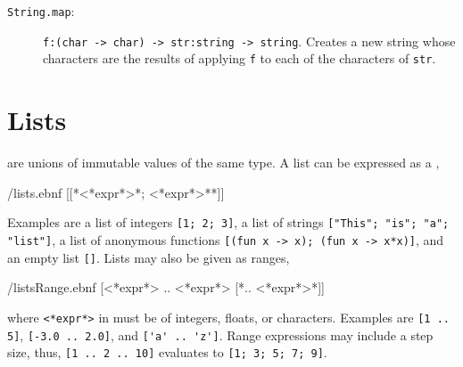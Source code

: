 \documentclass[fsharpnotes.tex]{subfiles}
\begin{document}
\begin{description}
 \item[\texttt{String.map}:] \lstinline{f:(char -> char) -> str:string -> string}. Creates a new string whose characters are the results of applying \lstinline{f} to each of the characters of \lstinline{str}.
\end{description}

\section{Lists}
 are unions of immutable values of the same type. A list can be expressed as a ,
%
\begin{verbatimwrite}{\ebnf/lists.ebnf}
[[*<*expr*>{*; <*expr*>*}*]]
\end{verbatimwrite}
%
Examples are a list of integers \mbox{\lstinline![1; 2; 3]!}, a list of strings \mbox{\lstinline!["This"; "is"; "a"; "list"]!}, a list of anonymous functions \mbox{\lstinline![(fun x -> x); (fun x -> x*x)]!}, and an empty list \lstinline![]!. Lists may also be given as ranges,
%
\begin{verbatimwrite}{\ebnf/listsRange.ebnf}
[<*expr*> .. <*expr*> [*.. <*expr*>*]]
\end{verbatimwrite}
%
where \lstinline[language=syntax]{<*expr*>} in  must be of integers, floats, or characters. Examples are \mbox{\lstinline![1 .. 5]!}, \mbox{\lstinline![-3.0 .. 2.0]!}, and \mbox{\lstinline!['a' .. 'z']!}. Range expressions may include a step size, thus, \mbox{\lstinline![1 .. 2 .. 10]!} evaluates to \mbox{\lstinline![1; 3; 5; 7; 9]!}.
\end{document}
